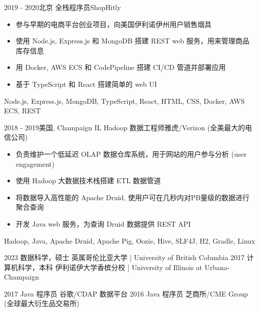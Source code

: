 \documentclass[alternative]{resume_template}
\begin{document}
\begin{experiences}
    \experience
    {2019 - 2020}{北京}
    {全栈程序员}{ShopHitly}
    {
        \begin{itemize}
        \item 参与早期的电商平台创业项目，向美国伊利诺伊州用户销售烟具
        \item 使用 Node.js, Express.js 和 MongoDB 搭建 REST web 服务，用来管理商品库存信息
        \item 用 Docker, AWS ECS 和 CodePipeline 搭建 CI/CD 管道并部署应用
        \item 基于 TypeScript 和 React 搭建简单的 web UI
        \end{itemize}
    }
    {Node.js, Express.js, MongoDB, TypeScript, React, HTML, CSS, Docker, AWS ECS, REST}
    
    \experience
    {2018 - 2019}{美国, Champaign IL}
    {Hadoop 数据工程师}{雅虎/Verizon (全美最大的电信公司)}
    {
        \begin{itemize}
        \item 负责维护一个低延迟 OLAP 数据仓库系统，用于网站的用户参与分析 (user engagement)
        \item 使用 Hadoop 大数据技术栈搭建 ETL 数据管道
        \item 将数据导入高性能的 Apache Druid, 使用户可在几秒内对PB量级的数据进行聚合查询
        \item 开发 Java web 服务，为查询 Druid 数据提供 REST API
        \end{itemize}
    }
    {Hadoop, Java, Apache Druid, Apache Pig, Oozie, Hive, SLF4J, H2, Gradle, Linux}
    
    \end{experiences}

    \begin{experiences}
    \degree
    {2023}
    {数据科学，硕士}
    {英属哥伦比亚大学 | University of British Columbia}
    \vspace{5pt}
	\degree
    {2017}
    {计算机科学，本科}
    {伊利诺伊大学香槟分校 | University of Illinois at Urbana-Champaign}
    \vspace{5pt}
    \end{experiences}

    \begin{experiences}
	\internship
    {2017}
    {Java 程序员}
    {谷歌/CDAP 数据平台}
    \vspace{5pt}
	\internship
    {2016}
    {Java 程序员}
    {芝商所/CME Group (全球最大衍生品交易所)}
    \end{experiences}
\end{document}
